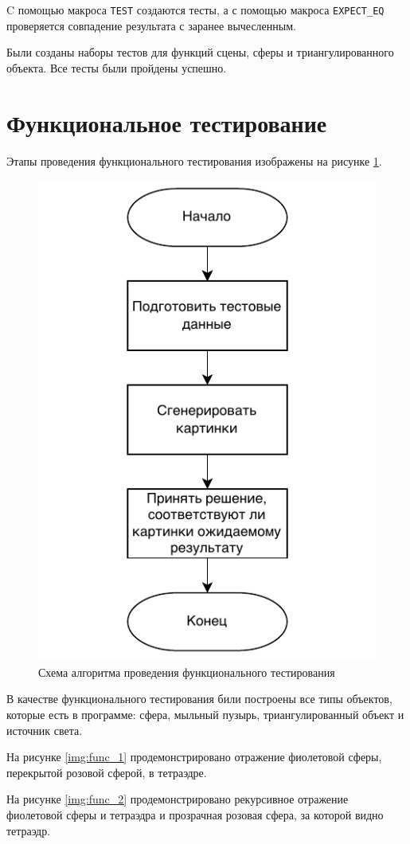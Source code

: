 C помощью макроса \texttt{TEST} создаются тесты, а с помощью макроса \texttt{EXPECT\_EQ} проверяется совпадение результата с заранее вычесленным.

Были созданы наборы тестов для функций сцены, сферы и триангулированного объекта. Все тесты были пройдены успешно.


\section{Функциональное тестирование}

Этапы проведения функционального тестирования изображены на рисунке \ref{img:func_test}.

\begin{figure}[H]
	\begin{center}
		\includegraphics[width=0.5\linewidth]{img/func_test.pdf}
	\end{center}
	\captionsetup{justification=centering}
	\caption{Схема алгоритма проведения функционального тестирования}
	\label{img:func_test}
\end{figure}

В качестве функционального тестирования били построены все типы объектов, которые есть в программе: сфера, мыльный пузырь, триангулированный объект и источник света.

На рисунке \ref{img:func_1} продемонстрировано отражение фиолетовой сферы, перекрытой розовой сферой, в тетраэдре.

На рисунке \ref{img:func_2} продемонстрировано рекурсивное отражение фиолетовой сферы и тетраэдра и прозрачная розовая сфера, за которой видно тетраэдр.

